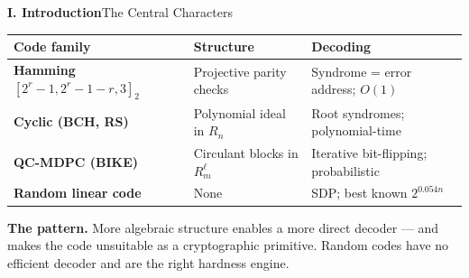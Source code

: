 \begin{frame}{\textbf{I. Introduction}}{The Central Characters}
\small
\begin{center}
\renewcommand{\arraystretch}{1.28}
\begin{tabular}{>{\bfseries}p{}p{}p{}}
\toprule
Code family & Structure & Decoding \\
\midrule
Hamming $[2^r-1,2^r-1-r,3]_2$ & Projective parity checks & Syndrome = error address; $O(1)$ \\
Cyclic (BCH, RS) & Polynomial ideal in $R_n$ & Root syndromes; polynomial-time \\
QC-MDPC (BIKE) & Circulant blocks in $R_m^\ell$ & Iterative bit-flipping; probabilistic \\
Random linear code & None & SDP; best known $2^{0.054n}$ \\
\bottomrule
\end{tabular}
\end{center}
\bigskip
\textbf{The pattern.}
More algebraic structure enables a more direct decoder —
and makes the code unsuitable as a cryptographic primitive.
Random codes have no efficient decoder and are the right hardness engine.
\end{frame}

